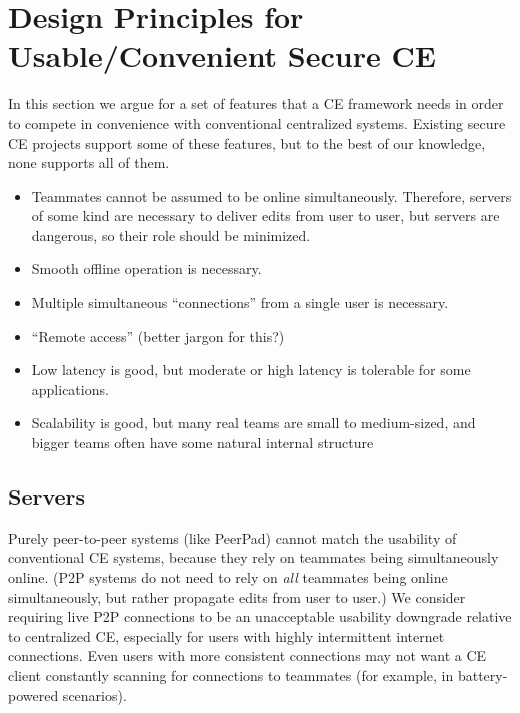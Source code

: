 \documentclass{article}
\begin{document}

\section{Design Principles for Usable/Convenient Secure CE}

In this section we argue for a set of features that a CE framework needs in order to compete in convenience with conventional centralized systems.
Existing secure CE projects support some of these features, but to the best of our knowledge, none supports all of them.

\begin{itemize}
\item Teammates cannot be assumed to be online simultaneously.
  Therefore, servers of some kind are necessary to deliver edits from user to user, but servers are dangerous, so their role should be minimized.
\item Smooth offline operation is necessary.
\item Multiple simultaneous ``connections'' from a single user is necessary.
\item ``Remote access'' (better jargon for this?)
\item Low latency is good, but moderate or high latency is tolerable for some applications.
\item Scalability is good, but many real teams are small to medium-sized, and bigger teams often have some natural internal structure
\end{itemize}

\subsection{Servers}

Purely peer-to-peer systems (like PeerPad) cannot match the usability of conventional CE systems, because they rely on teammates being simultaneously online.
(P2P systems do not need to rely on \emph{all} teammates being online simultaneously, but rather propagate edits from user to user.)
We consider requiring live P2P connections to be an unacceptable usability downgrade relative to centralized CE, especially for users with highly intermittent internet connections.
Even users with more consistent connections may not want a CE client constantly scanning for connections to teammates (for example, in battery-powered scenarios).
\end{document}
